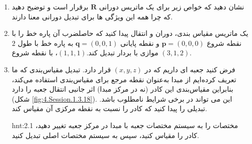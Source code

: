 {\begin{spacing}{1.5}
\begin{enumerate}[label=\textbf{\arabic*}.]
            \item {
                نشان دهید که خواص زیر برای یک ماتریس دورانی $\textbf{R}$ برقرار است و توضیح دهید که چرا همه این ویژگی ها برای تبدیل دورانی معنا دارند.
                 \textbf{\vspace{-6pt}}
            }

            \item {یک ماتریس مقیاس بندی، دوران و انتقال پیدا کنید که حاصلضرب آن پاره خط را با نقطه شروع $\textbf{p}=(0,0,0)$ و نقطه پایانی $\textbf{q}=(0,0,1)$ به پاره خط با طول $2$ موازی با بردار تبدیل کند.$(1,1,1)$، با نقطه شروع $(3,1,2)$.}

            \item {
                فرض کنید جعبه ای داریم که در $(x,y,z)$ قرار دارد. تبدیل مقیاس‌بندی که ما تعریف کرده‌ایم از مبدا به‌عنوان نقطه مرجع برای مقیاس‌بندی استفاده می‌کند،
                بنابراین مقیاس‌بندی این کادر (نه در مرکز مبدا) اثر جانبی انتقال جعبه را دارد (شکل \ref{fig:4.Session.1.3.18}).
                این می تواند در برخی شرایط نامطلوب باشد. تبدیلی را پیدا کنید که کادر را نسبت به نقطه مرکزی آن مقیاس کند.

                \begin{hint}{hnt:2.1}
                    \Large
                    مختصات را به سیستم مختصات جعبه با مبدا در مرکز جعبه تغییر دهید، کادر را مقیاس کنید، سپس به سیستم مختصات اصلی تبدیل کنید.
                \end{hint} \\

}
\end{enumerate}
\end{spacing}}
